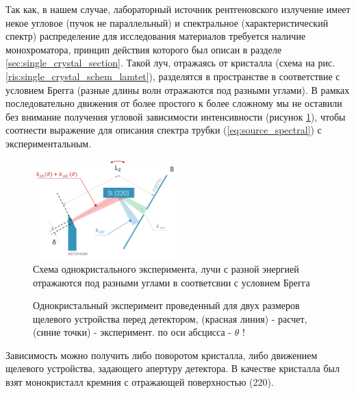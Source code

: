 Так как, в нашем случае, лабораторный источник рентгеновского излучение имеет
некое угловое  (пучок не параллельный) и спектральное (характеристический спектр) распределение
для исследования материалов требуется наличие монохроматора, принцип действия которого
был описан в разделе \ref{sec:single_crystal_section}. Такой луч, отражаясь от
кристалла (схема на рис. \ref{ris:single_crystal_schem_lamtet}), разделятся в пространстве
в соответствие с условием Брегга (разные длины волн отражаются под разными углами).
В рамках последовательно движения от более простого к более сложному мы не оставили без внимание
получения угловой зависимости интенсивности (рисунок \ref{ris:single_crystal_schem_exp}), чтобы соотнести
выражение для описания спектра трубки (\ref{eq:source_spectral}) с экспериментальным.

\begin{figure}[H]
  \centering
  \includegraphics[width=0.5\textwidth]{images/single_crystal_schem_exp.png}
  \caption{Схема однокристального эксперимента, лучи с разной энергией отражаются под разными углами
  в соответсвии с условием Брегга}
  \label{ris:single_crystal_schem_exp}
\end{figure}

\begin{figure}[H]
  \centering
  \hfill
  \caption{Однокристальный эксперимент проведенный для двух размеров щелевого устройства перед детектором,
   (красная линия) - расчет, (синие точки) - эксперимент. \textcolor{mygreen}{ по оси абсцисса - $\theta$ !} }
  \label{ris:zero_exp}
\end{figure}

Зависимость можно получить либо поворотом кристалла, либо движением щелевого устройства,
задающего апертуру детектора. В качестве кристалла был взят монокристалл кремния с отражающей
поверхностью (220).
